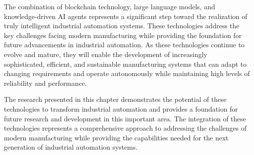 The combination of blockchain technology, large language models, and knowledge-driven AI agents represents a significant step toward the realization of truly intelligent industrial automation systems. These technologies address the key challenges facing modern manufacturing while providing the foundation for future advancements in industrial automation. As these technologies continue to evolve and mature, they will enable the development of increasingly sophisticated, efficient, and sustainable manufacturing systems that can adapt to changing requirements and operate autonomously while maintaining high levels of reliability and performance.

The research presented in this chapter demonstrates the potential of these technologies to transform industrial automation and provides a foundation for future research and development in this important area. The integration of these technologies represents a comprehensive approach to addressing the challenges of modern manufacturing while providing the capabilities needed for the next generation of industrial automation systems.
